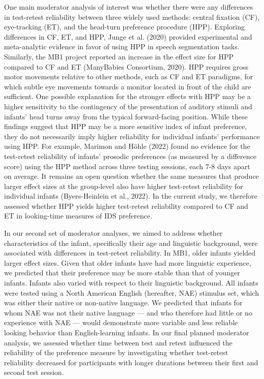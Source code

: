\documentclass[
  man,floatsintext]{apa6}
\begin{document}
One main moderator analysis of interest was whether there were any differences in test-retest reliability between three widely used methods: central fixation (CF), eye-tracking (ET), and the head-turn preference procedure (HPP).
Exploring differences in CF, ET, and HPP, Junge et al. (2020) provided experimental and meta-analytic evidence in favor of using HPP in speech segmentation tasks.
Similarly, the MB1 project reported an increase in the effect size for HPP compared to CF and ET (ManyBabies Consortium, 2020).
HPP requires gross motor movements relative to other methods, such as CF and ET paradigms, for which subtle eye movements towards a monitor located in front of the child are sufficient.
One possible explanation for the stronger effects with HPP may be a higher sensitivity to the contingency of the presentation of auditory stimuli and infants' head turns away from the typical forward-facing position.
While these findings suggest that HPP may be a more sensitive index of infant preference, they do not necessarily imply higher reliability for individual infants' performance using HPP.
For example, Marimon and Höhle (2022) found no evidence for the test-retest reliability of infants' prosodic preferences (as measured by a difference score) using the HPP method across three testing sessions, each 7-8 days apart on average.
It remains an open question whether the same measures that produce larger effect sizes at the group-level also have higher test-retest reliability for individual infants (Byers-Heinlein et al., 2022).
In the current study, we therefore assessed whether HPP yields higher test-retest reliability compared to CF and ET in looking-time measures of IDS preference.

In our second set of moderator analyses, we aimed to address whether characteristics of the infant, specifically their age and linguistic background, were associated with differences in test-retest reliability.
In MB1, older infants yielded larger effect sizes.
Given that older infants have had more linguistic experience, we predicted that their preference may be more stable than that of younger infants.
Infants also varied with respect to their linguistic background.
All infants were tested using a North American English (hereafter, NAE) stimulus set, which was either their native or non-native language.
We predicted that infants for whom NAE was not their native language --- and who therefore had little or no experience with NAE --- would demonstrate more variable and less reliable looking behavior than English-learning infants.
In our final planned moderator analysis, we assessed whether time between test and retest influenced the reliability of the preference measure by investigating whether test-retest reliability decreased for participants with longer durations between their first and second test session.
\end{document}
